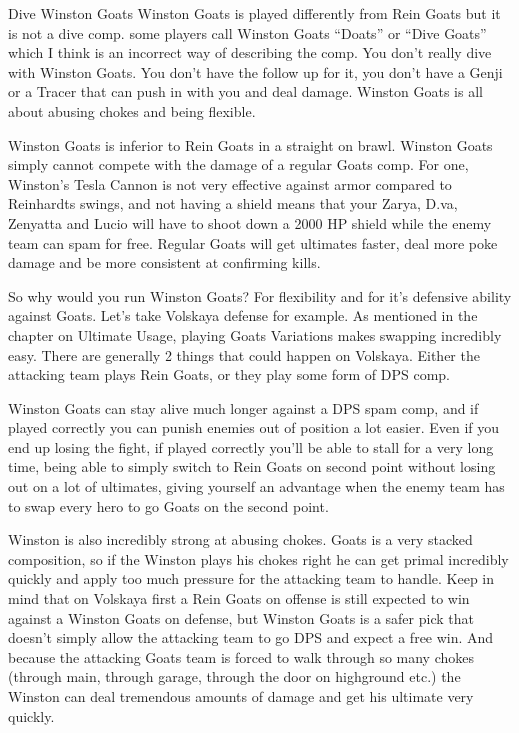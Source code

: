Dive Winston Goats
Winston Goats is played differently from Rein Goats but it is not a dive comp. some players call Winston Goats “Doats” or “Dive Goats” which I think is an incorrect way of describing the comp.
You don’t really dive with Winston Goats. You don’t have the follow up for it, you don’t have a Genji or a Tracer that can push in with you and deal damage. Winston Goats is all about abusing chokes and being flexible.

Winston Goats is inferior to Rein Goats in a straight on brawl. Winston Goats simply cannot compete with the damage of a regular Goats comp. For one, Winston’s Tesla Cannon is not very effective against armor compared to Reinhardts swings, and not having a shield means that your Zarya, D.va, Zenyatta and Lucio will have to shoot down a 2000 HP shield while the enemy team can spam for free. Regular Goats will get ultimates faster, deal more poke damage and be more consistent at confirming kills.

So why would you run Winston Goats? For flexibility and for it’s defensive ability against Goats. Let’s take Volskaya defense for example. As mentioned in the chapter on Ultimate Usage, playing Goats Variations makes swapping incredibly easy. There are generally 2 things that could happen on Volskaya. Either the attacking team plays Rein Goats, or they play some form of DPS comp.

Winston Goats can stay alive much longer against a DPS spam comp, and if played correctly you can punish enemies out of position a lot easier. Even if you end up losing the fight, if played correctly you’ll be able to stall for a very long time, being able to simply switch to Rein Goats on second point without losing out on a lot of ultimates, giving yourself an advantage when the enemy team has to swap every hero to go Goats on the second point. 

Winston is also incredibly strong at abusing chokes. Goats is a very stacked composition, so if the Winston plays his chokes right he can get primal incredibly quickly and apply too much pressure for the attacking team to handle. Keep in mind that on Volskaya first a Rein Goats on offense is still expected to win against a Winston Goats on defense, but Winston Goats is a safer pick that doesn’t simply allow the attacking team to go DPS and expect a free win.
And because the attacking Goats team is forced to walk through so many chokes (through main, through garage, through the door on highground etc.) the Winston can deal tremendous amounts of damage and get his ultimate very quickly.

